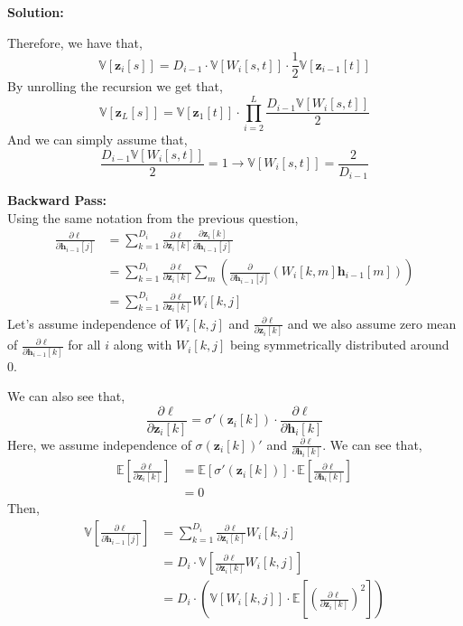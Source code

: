 \documentclass{article}
\newenvironment{solution}
  {\par\noindent\textbf{Solution:}\par}
  {\par}
\begin{document}
\begin{solution}
  Therefore, we have that,
  \[
    \mathbb{V}[\textbf{z}_i[s]]=D_{i-1} \cdot \mathbb{V}[W_i[s,t]] \cdot \frac{1}{2} \mathbb{V}[\textbf{z}_{i-1}[t]]
  \]
  By unrolling the recursion we get that,
  \[
    \mathbb{V}[\textbf{z}_L[s]] = \mathbb{V}[\textbf{z}_1[t]]  \cdot  \prod_{i=2}^L \frac{D_{i-1}\mathbb{V}[W_i[s,t]]}{2} 
  \]
  And we can simply assume that,
  \[
    \frac{D_{i-1}\mathbb{V}[W_i[s,t]]}{2}=1 \to \mathbb{V}[W_i[s,t]] = \frac{2}{D_{i-1}}
  \]

  \textbf{Backward Pass:} \\ 
  Using the same notation from the previous question, 
  \[
    \begin{aligned}
      \frac{\partial \ell}{\partial \textbf{h}_{i-1}[j]} &= \sum_{k=1}^{D_i} \frac{\partial \ell}{\partial \textbf{z}_i[k]}\frac{\partial \textbf{z}_i[k]}{\partial \textbf{h}_{i-1}[j]} \\ 
                                                         &=  \sum_{k=1}^{D_i} \frac{\partial \ell}{\partial \textbf{z}_i[k]} \sum_m\left(\frac{\partial }{\partial \textbf{h}_{i-1}[j]}\left(W_i[k,m]\textbf{h}_{i-1}[m]\right)\right) \\ 
                                                         &= \sum_{k=1}^{D_i} \frac{\partial \ell}{\partial \textbf{z}_i[k]}W_i[k,j] 
    \end{aligned}
    \]
    Let's assume independence of $W_i[k,j]$ and $\frac{\partial \ell}{\partial \textbf{z}_{i}[k]}$ and we also assume zero mean of $\frac{\partial \ell}{\partial \textbf{h}_{i-1}[k]}$ for all $i$ along with $W_i[k,j]$ being symmetrically distributed around 0.
    
    We can also see that,
    \[
      \frac{\partial \ell}{\partial\textbf{z}_i[k]} = \sigma '\left( \textbf{z}_i[k]\right) \cdot \frac{\partial \ell}{\partial \textbf{h}_i[k]}
  \]
  Here, we assume independence of $\sigma(\textbf{z}_i[k])'$ and $\frac{\partial \ell}{\partial \textbf{h}_i[k]}$.
  We can see that,
  \[
    \begin{aligned}
      \mathbb{E}\left[ \frac{\partial \ell}{\partial \textbf{z}_i[k]} \right] &= \mathbb{E}\left[ \sigma'(\textbf{z}_i[k]) \right] \cdot \mathbb{E}\left[ \frac{\partial \ell}{\partial \textbf{h}_i[k]} \right] \\ 
                                                                              &= 0
    \end{aligned}
    \]
    Then,
    \[
      \begin{aligned}
        \mathbb{V}\left[\frac{\partial \ell}{\partial \textbf{h}_{i-1}[j]}\right] &= \sum_{k=1}^{D_i} \frac{\partial \ell}{\partial \textbf{z}_i[k]}W_i[k,j] \\
                                                                                  &= D_i \cdot \mathbb{V}\left[ \frac{\partial \ell}{\partial \textbf{z}_i[k]}W_i[k,j]  \right] \\ 
                                                                                  &= D_i \cdot \left( \mathbb{V}\left[ W_i[k,j] \right] \cdot \mathbb{E}\left[ \left(\frac{\partial \ell}{\partial \textbf{z}_i[k]} \right)^2 \right] \right) 
      \end{aligned}
    \]


\end{solution}
\end{document}
